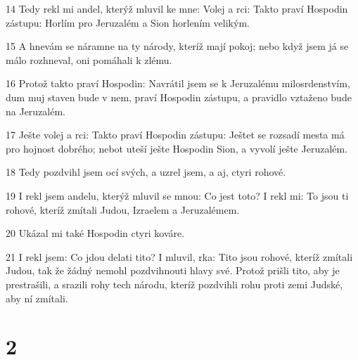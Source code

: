 \par 14 Tedy rekl mi andel, kterýž mluvil ke mne: Volej a rci: Takto praví Hospodin zástupu: Horlím pro Jeruzalém a Sion horlením velikým.
\par 15 A hnevám se náramne na ty národy, kteríž mají pokoj; nebo když jsem já se málo rozhneval, oni pomáhali k zlému.
\par 16 Protož takto praví Hospodin: Navrátil jsem se k Jeruzalému milosrdenstvím, dum muj staven bude v nem, praví Hospodin zástupu, a pravidlo vztaženo bude na Jeruzalém.
\par 17 Ješte volej a rci: Takto praví Hospodin zástupu: Ještet se rozsadí mesta má pro hojnost dobrého; nebot uteší ješte Hospodin Sion, a vyvolí ješte Jeruzalém.
\par 18 Tedy pozdvihl jsem ocí svých, a uzrel jsem, a aj, ctyri rohové.
\par 19 I rekl jsem andelu, kterýž mluvil se mnou: Co jest toto? I rekl mi: To jsou ti rohové, kteríž zmítali Judou, Izraelem a Jeruzalémem.
\par 20 Ukázal mi také Hospodin ctyri kováre.
\par 21 I rekl jsem: Co jdou delati tito? I mluvil, rka: Tito jsou rohové, kteríž zmítali Judou, tak že žádný nemohl pozdvihnouti hlavy své. Protož prišli tito, aby je prestrašili, a srazili rohy tech národu, kteríž pozdvihli rohu proti zemi Judské, aby ní zmítali.

\chapter{2}

